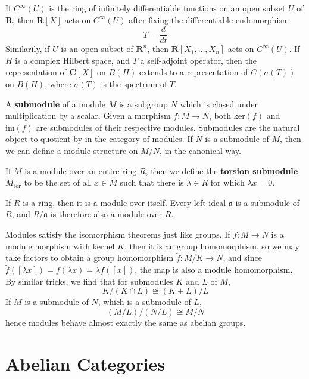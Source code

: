 \begin{example}
    If $C^\infty(U)$ is the ring of infinitely differentiable functions on an open subset $U$ of $\mathbf{R}$, then $\mathbf{R}[X]$ acts on $C^\infty(U)$ after fixing the differentiable endomorphism
    \[ T = \frac{d}{dt} \]
    Similarily, if $U$ is an open subset of $\mathbf{R}^n$, then $\mathbf{R}[X_1, \dots, X_n]$ acts on $C^\infty(U)$. If $H$ is a complex Hilbert space, and $T$ a self-adjoint operator, then the representation of $\mathbf{C}[X]$ on $B(H)$ extends to a representation of $C(\sigma(T))$ on $B(H)$, where $\sigma(T)$ is the spectrum of $T$.
\end{example}

A {\bf submodule} of a module $M$ is a subgroup $N$ which is closed under multiplication by a scalar. Given a morphism $f: M \to N$, both $\text{ker}(f)$ and $\text{im}(f)$ are submodules of their respective modules. Submodules are the natural object to quotient by in the category of modules. If $N$ is a submodule of $M$, then we can define a module structure on $M/N$, in the canonical way.

\begin{example}
    If $M$ is a module over an entire ring $R$, then we define the {\bf torsion submodule} $M_{\text{tor}}$ to be the set of all $x \in M$ such that there is $\lambda \in R$ for which $\lambda x = 0$.
\end{example}

\begin{example}
    If $R$ is a ring, then it is a module over itself. Every left ideal $\mathfrak{a}$ is a submodule of $R$, and $R/\mathfrak{a}$ is therefore also a module over $R$.
\end{example}

Modules satisfy the isomorphism theorems just like groups. If $f:M \to N$ is a module morphism with kernel $K$, then it is an group homomorphism, so we may take factors to obtain a group homomorphism $\tilde{f}: M/K \to N$, and since $\tilde{f}([\lambda x]) = f(\lambda x) = \lambda f([x])$, the map is also a module homomorphism. By similar tricks, we find that for submodules $K$ and $L$ of $M$,
%
\[ K/(K \cap L) \cong (K + L)/L \]
%
If $M$ is a submodule of $N$, which is a submodule of $L$,
%
\[ (M/L)/(N/L) \cong M/N \]
%
hence modules behave almost exactly the same as abelian groups.

\section{Abelian Categories}


